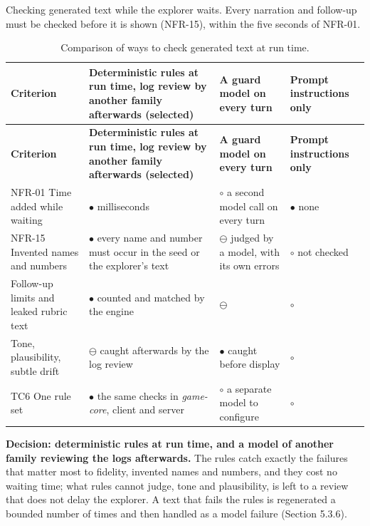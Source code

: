 Checking generated text while the explorer waits. Every narration and follow-up must be checked before it is shown (NFR-15), within the five seconds of NFR-01.

{\small
\begin{longtable}{|>{\raggedright\arraybackslash}p{}|>{\raggedright\arraybackslash}p{}|>{\raggedright\arraybackslash}p{}|>{\raggedright\arraybackslash}p{}|}
\caption{Comparison of ways to check generated text at run time.} \\
\hline
\textbf{Criterion} & \textbf{Deterministic rules at run time, log review by another family afterwards (selected)} & \textbf{A guard model on every turn\cite{r199}} & \textbf{Prompt instructions only} \\ \hline
\endfirsthead
\hline
\textbf{Criterion} & \textbf{Deterministic rules at run time, log review by another family afterwards (selected)} & \textbf{A guard model on every turn\cite{r199}} & \textbf{Prompt instructions only} \\ \hline
\endhead
NFR-01 Time added while waiting & $\bullet$ milliseconds & $\circ$ a second model call on every turn & $\bullet$ none \\ \hline
NFR-15 Invented names and numbers & $\bullet$ every name and number must occur in the seed or the explorer's text & $\ominus$ judged by a model, with its own errors & $\circ$ not checked \\ \hline
Follow-up limits and leaked rubric text & $\bullet$ counted and matched by the engine & $\ominus$ & $\circ$ \\ \hline
Tone, plausibility, subtle drift & $\ominus$ caught afterwards by the log review & $\bullet$ caught before display & $\circ$ \\ \hline
TC6 One rule set & $\bullet$ the same checks in \textit{game-core}, client and server & $\circ$ a separate model to configure & $\circ$ \\ \hline
\end{longtable}
}

\textbf{Decision: deterministic rules at run time, and a model of another family reviewing the logs afterwards.} The rules catch exactly the failures that matter most to fidelity, invented names and numbers, and they cost no waiting time; what rules cannot judge, tone and plausibility, is left to a review that does not delay the explorer. A text that fails the rules is regenerated a bounded number of times and then handled as a model failure (Section 5.3.6).

